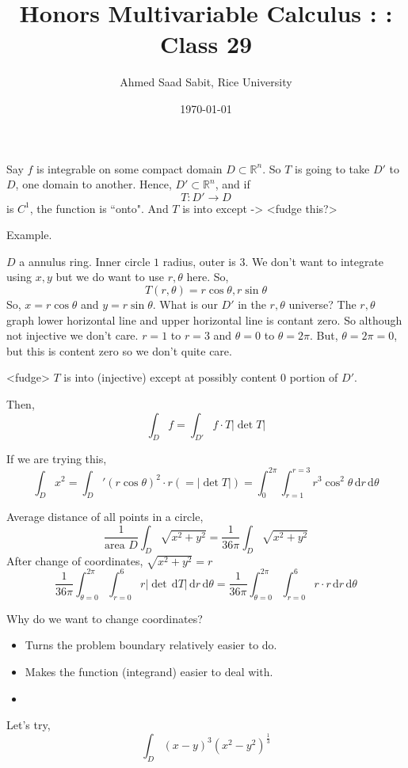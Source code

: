 \documentclass[letter]{article}
\title{Honors Multivariable Calculus : : Class 29}
\author{Ahmed Saad Sabit, Rice University}
\date{\today}
\renewcommand{\d}{\,\mathrm{d}}
\begin{document}
\maketitle
Say $f$ is integrable on some compact domain $D \subset \mathbb{R}^{n}$. So $T$ is going to take $D'$ to $D$, one domain to another. Hence, $D' \subset \mathbb{R}^{n}$, and if 
\[
T : D' \to D
\]  is $C^1$, the function is ``onto". And $T$ is into except -> <fudge this?> 

Example. 

$D$ a annulus ring. Inner circle $1$ radius, outer is $3$. We don't want to integrate using $x,y$ but we do want to use $r, \theta$ here. So, 
\[
T(r, \theta) = r \cos \theta, r \sin \theta
\] 
So, $x = r \cos \theta$ and $y = r \sin \theta$. What is our $D'$ in the $r, \theta$ universe? The $r, \theta$ graph lower horizontal line and upper horizontal line is contant zero. So although not injective we don't care. $r = 1$  to $r= 3$ and $\theta = 0$ to $\theta = 2\pi $. But, $\theta = 2 \pi  = 0$, but this is content zero so we don't quite care. 

<fudge> $T$ is into (injective) except at possibly content $0$ portion of $D'$. 

Then, 
\[
	\int_D f = \int_{D'} f \cdot T | \det  T | 
\]


If we are trying this, 
\[
\int_D x^2 = \int_D' (r \cos \theta)^2  \cdot r (= | \det T| ) = \int_0^{2\pi } 
\int_{r = 1}^{r=3} r^3 \cos ^2 \theta \, \mathrm{d} r \, \mathrm{d}  \theta  
\]

Average distance of all points in a circle, 
\[
\frac{1}{\text{area }D} \int_D \sqrt{x^2 + y^2}  = \frac{1}{36 \pi } \int_D \sqrt{x^2 + y^2}  
\]
After change of coordinates, $\sqrt{x^2 + y^2 }  = r$
\[
\frac{1}{36 \pi } \int_{\theta = 0}^{2 \pi } \int_{r = 0}^{6} r | \det \d T| \d r \d \theta  
=\frac{1}{36 \pi } \int_{\theta = 0}^{2 \pi } \int_{r = 0}^{6} r \cdot  r \d r \d \theta  
\] 

Why do we want to change coordinates? 
\begin{itemize}
	\item Turns the problem boundary relatively easier to do.
	\item Makes the function (integrand) easier to deal with. 
	\item 
\end{itemize}

Let's try, 
\[
\int_D (x-y) ^3 (x^2 - y^2) ^{\frac{1}{3}}
\] 
\end{document}
